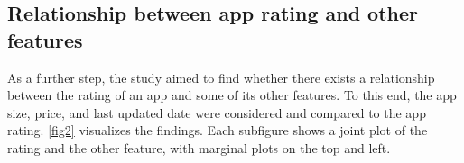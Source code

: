\documentclass{article}
\begin{document}
\subsection{Relationship between app rating and other features}
\label{other_features}

As a further step, the study aimed to find whether there exists a relationship between the rating of an app and some of its other features. To this end, the app size, price, and last updated date were considered and compared to the app rating. \cref{fig2} visualizes the findings. Each subfigure shows a joint plot of the rating and the other feature, with marginal plots on the top and left. 


\begin{figure}[h]\centering
{}\hfill
{}\par 
{}

\end{figure}
\end{document}
